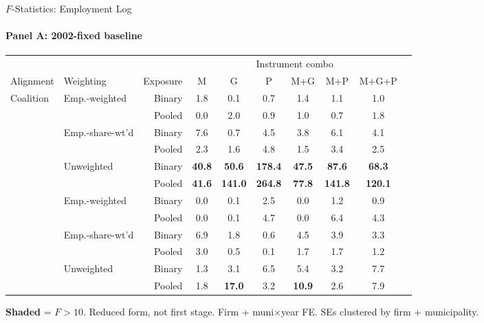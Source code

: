 \documentclass[aspectratio=169,10pt]{beamer}
\newcommand{\fpass}[1]{\cellcolor{pass}\textbf{#1}}
\begin{document}
\begin{frame}[t]{$F$-Statistics: Employment Log}
\framesubtitle{Panel A: 2002-fixed baseline}
\begin{center}
\footnotesize
\setlength{\tabcolsep}{3.5pt}
\renewcommand{\arraystretch}{1.05}
\begin{tabular}{@{}llrccccccc@{}}
\toprule
 & & & \multicolumn{6}{c}{Instrument combo} \\
\cmidrule(l{2pt}r{2pt}){4-9}
Alignment & Weighting & Exposure & M & G & P & M+G & M+P & M+G+P \\
\midrule
  \multirow{6}{*}{Coalition} & \multirow{2}{*}{Emp.-weighted} & Binary & 1.8 & 0.1 & 0.7 & 1.4 & 1.1 & 1.0 \\
   &  & Pooled & 0.0 & 2.0 & 0.9 & 1.0 & 0.7 & 1.8 \\
   & \multirow{2}{*}{Emp.-share-wt'd} & Binary & 7.6 & 0.7 & 4.5 & 3.8 & 6.1 & 4.1 \\
   &  & Pooled & 2.3 & 1.6 & 4.8 & 1.5 & 3.4 & 2.5 \\
   & \multirow{2}{*}{Unweighted} & Binary & \fpass{40.8} & \fpass{50.6} & \fpass{178.4} & \fpass{47.5} & \fpass{87.6} & \fpass{68.3} \\
   &  & Pooled & \fpass{41.6} & \fpass{141.0} & \fpass{264.8} & \fpass{77.8} & \fpass{141.8} & \fpass{120.1} \\
\addlinespace[5pt]
  \multirow{6}{*}{Party} & \multirow{2}{*}{Emp.-weighted} & Binary & 0.0 & 0.1 & 2.5 & 0.0 & 1.2 & 0.9 \\
   &  & Pooled & 0.0 & 0.1 & 4.7 & 0.0 & 6.4 & 4.3 \\
   & \multirow{2}{*}{Emp.-share-wt'd} & Binary & 6.9 & 1.8 & 0.6 & 4.5 & 3.9 & 3.3 \\
   &  & Pooled & 3.0 & 0.5 & 0.1 & 1.7 & 1.7 & 1.2 \\
   & \multirow{2}{*}{Unweighted} & Binary & 1.3 & 3.1 & 6.5 & 5.4 & 3.2 & 7.7 \\
   &  & Pooled & 1.8 & \fpass{17.0} & 3.2 & \fpass{10.9} & 2.6 & 7.9 \\
\bottomrule
\end{tabular}
\end{center}
{\scriptsize \colorbox{pass}{\textbf{Shaded}} = $F>10$. \textcolor{alertred}{Reduced form, not first stage.} Firm + muni$\times$year FE. SEs clustered by firm + municipality.}
\end{frame}
\end{document}
